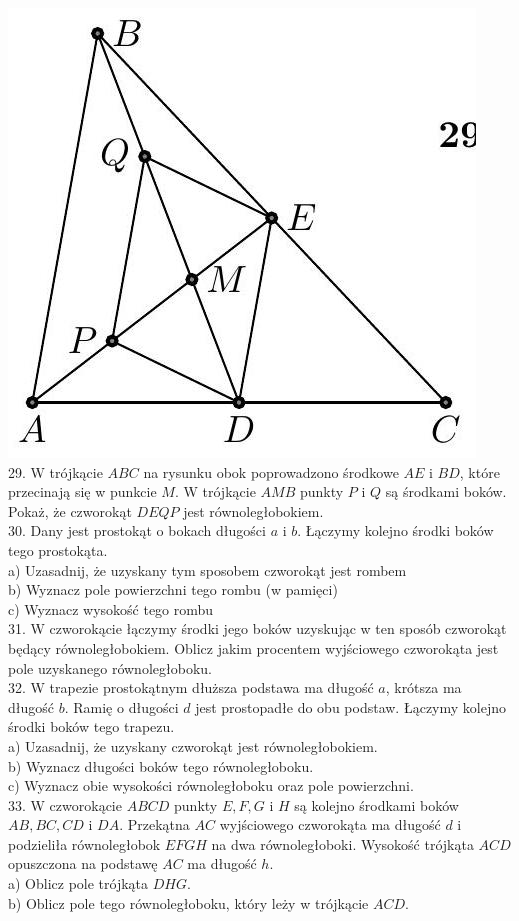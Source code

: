 \documentclass[10pt]{article}
\begin{document}
\includegraphics[max width=\textwidth, center]{2024_11_21_e9b4faa005d5be2cc318g-014}\\
29. W trójkącie \(A B C\) na rysunku obok poprowadzono środkowe \(A E\) i \(B D\), które przecinają się w punkcie \(M\). W trójkącie \(A M B\) punkty \(P\) i \(Q\) są środkami boków. Pokaż, że czworokąt \(D E Q P\) jest równoległobokiem.\\
30. Dany jest prostokąt o bokach długości \(a\) i \(b\). Łączymy kolejno środki boków tego prostokąta.\\
a) Uzasadnij, że uzyskany tym sposobem czworokąt jest rombem\\
b) Wyznacz pole powierzchni tego rombu (w pamięci)\\
c) Wyznacz wysokość tego rombu\\
31. W czworokącie łączymy środki jego boków uzyskując w ten sposób czworokąt będący równoległobokiem. Oblicz jakim procentem wyjściowego czworokąta jest pole uzyskanego równoległoboku.\\
32. W trapezie prostokątnym dłuższa podstawa ma długość \(a\), krótsza ma długość \(b\). Ramię o długości \(d\) jest prostopadłe do obu podstaw. Łączymy kolejno środki boków tego trapezu.\\
a) Uzasadnij, że uzyskany czworokąt jest równoległobokiem.\\
b) Wyznacz długości boków tego równoległoboku.\\
c) Wyznacz obie wysokości równoległoboku oraz pole powierzchni.\\
33. W czworokącie \(A B C D\) punkty \(E, F, G\) i \(H\) są kolejno środkami boków \(A B, B C, C D\) i \(D A\). Przekątna \(A C\) wyjściowego czworokąta ma długość \(d\) i podzieliła równoległobok \(E F G H\) na dwa równoległoboki. Wysokość trójkąta \(A C D\) opuszczona na podstawę \(A C\) ma długość \(h\).\\
a) Oblicz pole trójkąta \(D H G\).\\
b) Oblicz pole tego równoległoboku, który leży w trójkącie \(A C D\).
\end{document}
